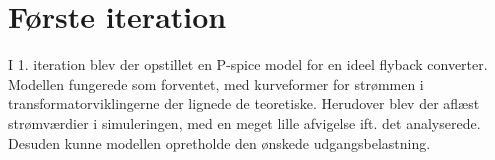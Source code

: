 
\section{Første iteration}
I 1. iteration blev der opstillet en P-spice model for en ideel flyback converter. Modellen fungerede som forventet, med kurveformer for strømmen i transformatorviklingerne der lignede de teoretiske. Herudover blev der aflæst strømværdier i simuleringen, med en meget lille afvigelse ift. det analyserede. Desuden kunne modellen opretholde den ønskede udgangsbelastning. 